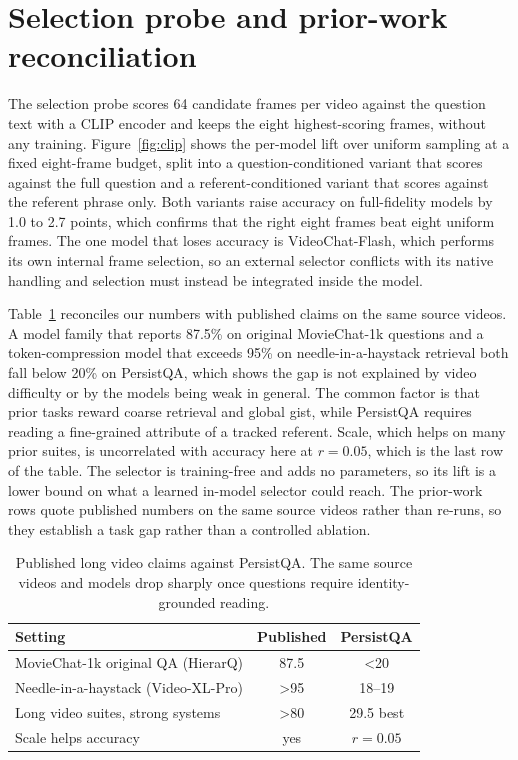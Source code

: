 \documentclass{article}
\newcommand{\bench}{PersistQA}
\begin{document}
\section{Selection probe and prior-work reconciliation}
\label{app:extra}
The selection probe scores 64 candidate frames per video against the question text with a CLIP encoder and keeps the eight highest-scoring frames, without any training. Figure~\ref{fig:clip} shows the per-model lift over uniform sampling at a fixed eight-frame budget, split into a question-conditioned variant that scores against the full question and a referent-conditioned variant that scores against the referent phrase only. Both variants raise accuracy on full-fidelity models by 1.0 to 2.7 points, which confirms that the right eight frames beat eight uniform frames. The one model that loses accuracy is VideoChat-Flash, which performs its own internal frame selection, so an external selector conflicts with its native handling and selection must instead be integrated inside the model.

Table~\ref{tab:prior} reconciles our numbers with published claims on the same source videos. A model family that reports 87.5\% on original MovieChat-1k questions and a token-compression model that exceeds 95\% on needle-in-a-haystack retrieval both fall below 20\% on \bench, which shows the gap is not explained by video difficulty or by the models being weak in general. The common factor is that prior tasks reward coarse retrieval and global gist, while \bench{} requires reading a fine-grained attribute of a tracked referent. Scale, which helps on many prior suites, is uncorrelated with accuracy here at $r=0.05$, which is the last row of the table. The selector is training-free and adds no parameters, so its lift is a lower bound on what a learned in-model selector could reach. The prior-work rows quote published numbers on the same source videos rather than re-runs, so they establish a task gap rather than a controlled ablation.

\begin{table}[t]
\centering
\caption{Published long video claims against \bench. The same source videos and models drop sharply once questions require identity-grounded reading.}
\label{tab:prior}
\small
\begin{tabular}{@{}lcc@{}}
\toprule
Setting & Published & \bench \\
\midrule
MovieChat-1k original QA (HierarQ) & 87.5 & \textless 20 \\
Needle-in-a-haystack (Video-XL-Pro) & \textgreater 95 & 18--19 \\
Long video suites, strong systems & \textgreater 80 & 29.5 best \\
Scale helps accuracy & yes & $r=0.05$ \\
\bottomrule
\end{tabular}
\end{table}
\end{document}

